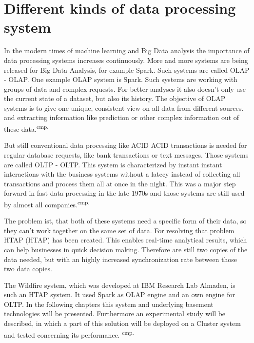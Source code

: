 \section{Different kinds of data processing system}

In the modern times of machine learning and Big Data analysis the importance of data processing systems increases continuously. More and more systems are being released for Big Data Analysis, for example Spark. Such systems are called \acs{OLAP} - \acl{OLAP}. One example OLAP system is Spark. Such systems are working with groups of data and complex requests. For better analyses it also doesn't only use the current state of a dataset, but also its history. The objective of OLAP systems is to give one unique, consistent view on all data from different sources. and extracting information like prediction or other complex information out of these data.\textsuperscript{cmp.\cite{5}}


But still conventional data processing like \acs{ACID} \acl{ACID} transactions is needed for regular database requests, like bank transactions or text messages. Those systems are called \acl{OLTP} - \acl{OLTP}. This system is characterized by instant instant interactions with the business systems without a latecy instead of collecting all transactions and process them all at once in the night. This was a major step forward in fast data processing in the late 1970s and those systems are still used by almost all companies.\textsuperscript{cmp.\cite{6}}


The problem ist, that both of these systems need a specific form of their data, so they can't work together on the same set of data. For resolving that problem \acs{HTAP} (\acl{HTAP}) has been created. This enables real-time analytical results, which can help businesses in quick decision making. Therefore are still two copies of the data needed, but with an highly increased synchronization rate between those two data copies.

The Wildfire system, which was developed at IBM Research Lab Almaden, is such an HTAP system. It used Spark as OLAP engine and an own engine for OLTP. In the following chapters this system and underlying basement technologies will be presented. Furthermore an experimental study will be described, in which a part of this solution will be deployed on a Cluster system and tested concerning its performance. \textsuperscript{cmp.\cite{7}}

